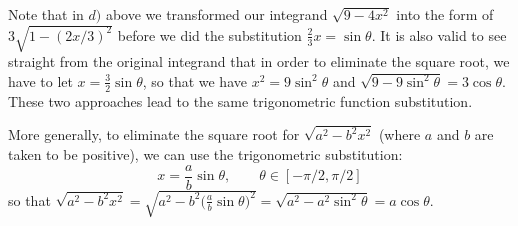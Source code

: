 Note that in $d)$ above we transformed our integrand $\sqrt{9-4x^2}$ into the form of $3\sqrt{1-(2x/3)^2}$ before we did the substitution $\frac{2}{3}x = \sin \theta$.  It is also valid to see straight from the original integrand that in order to eliminate the square root, we have to let $x = \frac{3}{2} \sin \theta$, so that we have $x^2 = 9\sin^2 \theta$ and $\sqrt{9-9\sin^2\theta} = 3 \cos \theta$.  These two approaches lead to the same trigonometric function substitution.  

More generally, to eliminate the square root for $\sqrt{a^2-b^2x^2}$ (where $a$ and $b$ are taken to be positive), we can use the trigonometric substitution:
\[x = \frac{a}{b}\sin\theta, \qquad \theta \in [-\pi/2, \pi/2]\] 
so that $\sqrt{a^2-b^2x^2}  = \sqrt{a^2-b^2\big(\frac{a}{b}\sin\theta\big)^2} = \sqrt{a^2-a^2\sin^2\theta} = a\cos\theta$.

